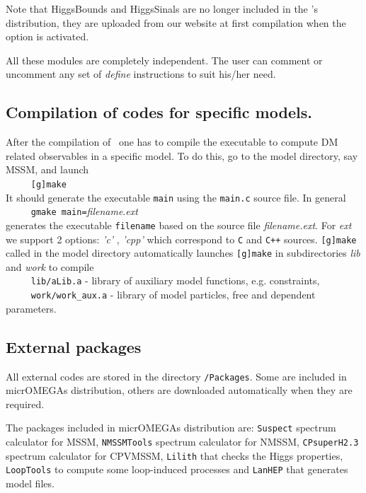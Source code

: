 \documentclass[12pt,a4paper]{article}
\begin{document}
Note that HiggsBounds and HiggsSinals are no longer included in the \micro's distribution, they are uploaded from our website at first compilation when the option is activated.  

All these modules are completely independent. The user can comment or
uncomment any set of {\it define} instructions to suit his/her need. 



\subsection{Compilation of codes for specific models.}
 After the compilation of \micro\ one has to compile
the executable to compute DM related observables in a specific model. To
do this, go to the model directory, say MSSM,  and launch\\

\verb|     [g]make|\\
It should generate the executable {\tt main} using the {\tt main.c} source file. In
general\\

\verb|     gmake main=|{\it filename}.{\it ext}\\ 
generates the executable {\tt filename}  based on the source file {\it
filename.ext}.
For {\it ext}  we support 2 options: {\it 'c'} ,  {\it 'cpp'} which correspond to
{\tt C}  and {\tt C++} sources.
{\tt [g]make} called  in the model directory automatically  launches {\tt [g]make}
in subdirectories {\it lib} and {\it work} to compile \\
 \verb|     lib/aLib.a|   - library of auxiliary model functions, e.g. constraints,\\
 \verb|     work/work_aux.a| - library of model particles, free and dependent parameters.\\
 
\subsection{External packages}

All external codes are stored in the directory {\tt /Packages}.
Some  are included in micrOMEGAs distribution, others are downloaded automatically when
they are required.
 
The packages included in micrOMEGAs distribution are:
 {\tt Suspect}  spectrum calculator  for MSSM, 
 {\tt NMSSMTools} spectrum calculator  for NMSSM, 
 {\tt CPsuperH2.3 } spectrum calculator for CPVMSSM, 
 {\tt Lilith} that checks the Higgs properties,  {\tt LoopTools} to compute some loop-induced processes and {\tt LanHEP} that generates model
 files.
\end{document}
